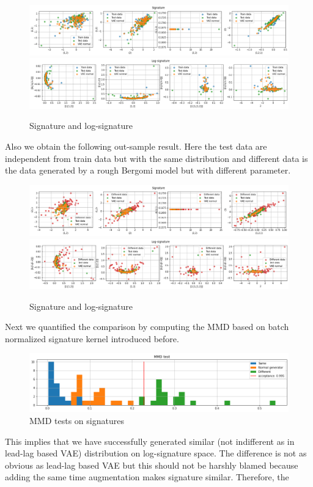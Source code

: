 \documentclass[12pt]{report}
\theoremstyle{definition}
\theoremstyle{remark}
\begin{document}
 \begin{figure}[H]
    \centering
    \includegraphics[width=\textwidth]{figs/cvae17.png}
    \includegraphics[width=\textwidth]{figs/cvae18.png}
    \caption{Signature and log-signature}
\end{figure}
Also we obtain the following out-sample result. Here the test data are independent from train data but with the same distribution and different data is the data generated by a rough Bergomi model but with different parameter.
 \begin{figure}[H]
    \centering
    \includegraphics[width=\textwidth]{figs/cvae19.png}
    \includegraphics[width=\textwidth]{figs/cvae20.png}
    \caption{Signature and log-signature}
\end{figure}
Next we quantified the comparison by computing the MMD based on batch normalized signature kernel introduced before. 
\begin{figure}[H]
    \centering
    \includegraphics[width=\textwidth]{figs/cvae21.png}
    \caption{MMD tests on signatures}
\end{figure}
This implies that we have successfully generated similar (not indifferent as in lead-lag based VAE) distribution on log-signature space. The difference is not as obvious as lead-lag based VAE but this should not be harshly blamed because adding the same time augmentation makes signature similar. Therefore, the 
\end{document}
